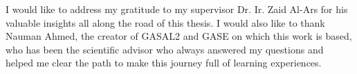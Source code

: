 

\vskip 1cm

I would like to address my gratitude to my supervisor Dr. Ir. Zaid Al-Ars for his valuable insights all along the road of this thesis. I would also like to thank Nauman Ahmed, the creator of GASAL2 and GASE on which this work is based, who has been the scientific advisor who always answered my questions and helped me clear the path to make this journey full of learning experiences.



\vskip 2cm
\noindent \AUTHOR \\
\PLACE \\
\DATE


